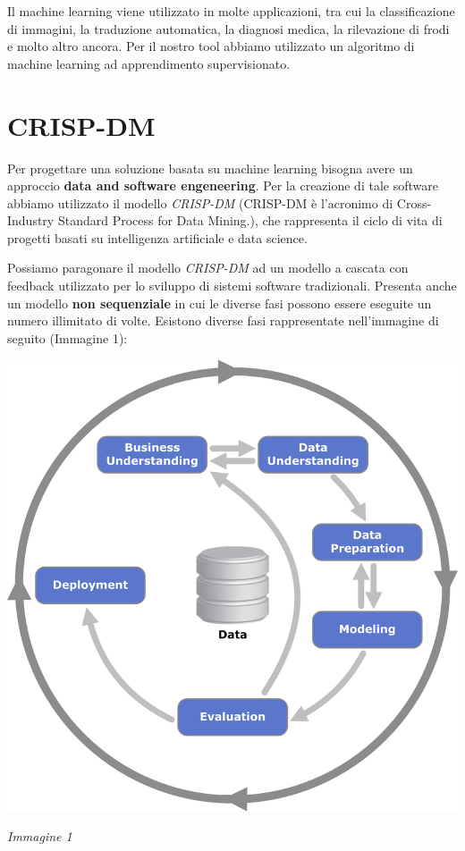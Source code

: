 \documentclass{article}
\begin{document}
Il machine learning viene utilizzato in molte applicazioni, tra cui la classificazione di immagini, la traduzione automatica, la diagnosi medica, la rilevazione di frodi e molto altro ancora.
Per il nostro tool abbiamo utilizzato un algoritmo di machine learning ad apprendimento supervisionato.

\section{CRISP-DM}
Per progettare una soluzione basata su machine learning bisogna avere un approccio \textbf{data and software engeneering}.
Per la creazione di tale software abbiamo utilizzato il modello \textit{CRISP-DM} (CRISP-DM è l’acronimo di Cross-Industry Standard Process for Data Mining.),
che rappresenta il ciclo di vita di progetti basati su intelligenza artificiale e data science.

Possiamo paragonare il modello \textit{CRISP-DM} ad un modello a cascata con feedback utilizzato per lo sviluppo di sistemi software
tradizionali. Presenta anche un modello \textbf{non sequenziale} in cui le diverse fasi possono essere eseguite un numero illimitato
di volte. Esistono diverse fasi rappresentate nell'immagine di seguito (Immagine 1):

\begin{center}
    \includegraphics[scale=2.8]{CRISP-DM.png}

    \textit{Immagine 1}
\end{center}
\end{document}
